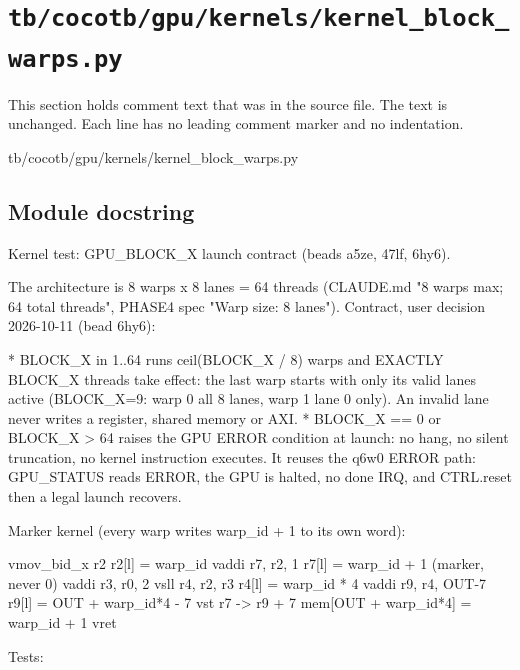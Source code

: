 \section{\texttt{tb/cocotb/gpu/kernels/kernel\_block\_warps.py}}\label{tm:suite:gpu-kernels-kernel-block-warps}

This section holds comment text that was in the source file. The text is unchanged. Each line has no leading comment marker and no indentation.

\begin{relocated}{tb/cocotb/gpu/kernels/kernel_block_warps.py}

\subsection*{Module docstring}

\begin{textblock}
Kernel test: GPU_BLOCK_X launch contract (beads a5ze, 47lf, 6hy6).

The architecture is 8 warps x 8 lanes = 64 threads (CLAUDE.md "8 warps max; 64 total threads",
PHASE4 spec "Warp size: 8 lanes").  Contract, user decision 2026-10-11 (bead 6hy6):

* BLOCK_X in 1..64 runs ceil(BLOCK_X / 8) warps and EXACTLY BLOCK_X threads take effect:
the last warp starts with only its valid lanes active (BLOCK_X=9: warp 0 all 8 lanes,
warp 1 lane 0 only).  An invalid lane never writes a register, shared memory or AXI.
* BLOCK_X == 0 or BLOCK_X > 64 raises the GPU ERROR condition at launch: no hang, no silent
truncation, no kernel instruction executes.  It reuses the q6w0 ERROR path: GPU_STATUS
reads ERROR, the GPU is halted, no done IRQ, and CTRL.reset then a legal launch recovers.

Marker kernel (every warp writes warp_id + 1 to its own word):

vmov_bid_x r2           r2[l] = warp_id
vaddi r7, r2, 1         r7[l] = warp_id + 1          (marker, never 0)
vaddi r3, r0, 2
vsll  r4, r2, r3        r4[l] = warp_id * 4
vaddi r9, r4, OUT-7     r9[l] = OUT + warp_id*4 - 7
vst   r7 -> r9 + 7      mem[OUT + warp_id*4] = warp_id + 1
vret

Tests:


\end{textblock}
\end{relocated}
